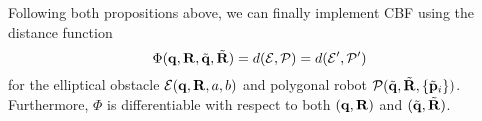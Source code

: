 \begin{comment}
Consequently, the partial derivatives will be the same as equations \eqref{eq: ellipse_to_point_partial_1}--\eqref{eq: ellipse_to_point_partial_4}, where 
\begin{equation}
\label{eq: ellipse_to_point_gradienSpecial}
    \nabla \psi_\calE(\bfp_{\Delta_i}') = \frac{\bfp_{\Delta_i}' - \underline{\bfp_{\Delta_i}'}}{\| \bfp_{\Delta_i}' - \underline{\bfp_{\Delta_i}'} \|},
\end{equation}
and $\tilde{\bfp}_{\Delta_i} = \tilde{\bfR}^\top \bfR \bfp_{\Delta_i}'  + \tilde{\bfR}^\top(\bfq -\tilde{\bfq})$ in the robot's frame.
\end{comment}

Following both propositions above, we can finally implement CBF using the distance function 
\begin{equation}
\label{eq: distance_ellipse_polygon_final}
    \Phi(\mathbf{q}, \mathbf{R}, \tilde{\mathbf{q}}, \tilde{\mathbf{R}}) = d({\cal E}, {\cal P}) = d({\cal E}',{\cal P}')
\end{equation}
for the elliptical obstacle ${\cal E}(\mathbf{q}, \mathbf{R}, a, b)$ and polygonal robot ${\cal P}(\tilde{\mathbf{q}}, \tilde{\mathbf{R}}, \{\tilde{\mathbf{p}}_i\})$. Furthermore, $\Phi$ is differentiable with respect to both $(\mathbf{q}, \mathbf{R})$ and $(\tilde{\mathbf{q}}, \tilde{\mathbf{R}})$.


